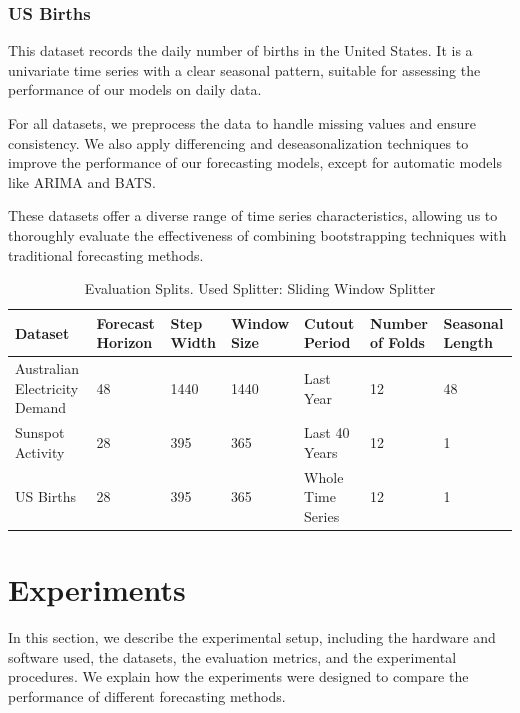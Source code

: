 \subsubsection{US Births}
This dataset records the daily number of births in the United States. It is a univariate time series with a clear seasonal pattern, suitable for assessing the performance of our models on daily data.

For all datasets, we preprocess the data to handle missing values and ensure consistency. We also apply differencing and deseasonalization techniques to improve the performance of our forecasting models, except for automatic models like ARIMA and BATS.

These datasets offer a diverse range of time series characteristics, allowing us to thoroughly evaluate the effectiveness of combining bootstrapping techniques with traditional forecasting methods.

\begin{table}[h]
    \centering
    \footnotesize

    \caption{Evaluation Splits. Used Splitter: Sliding Window Splitter}
    \label{tab:evaluation_splits}
    \begin{tabularx}{\textwidth}{X|X|X|X|X|X|X}
         \toprule
        Dataset & Forecast Horizon & Step Width & Window Size & Cutout Period & Number of Folds & Seasonal Length \\ \midrule
        Australian Electricity Demand & 48 & 1440 & 1440 & Last Year & 12 & 48 \\ 
        Sunspot Activity & 28 & 395 & 365 & Last 40 Years & 12 & 1\\
        US Births & 28 & 395 & 365 & Whole Time Series & 12 & 1 \\
        \bottomrule
    \end{tabularx}
\end{table}

\section{Experiments} \label{experiments}
In this section, we describe the experimental setup, including the hardware and software used, the datasets, the evaluation metrics, and the experimental procedures. We explain how the experiments were designed to compare the performance of different forecasting methods.





